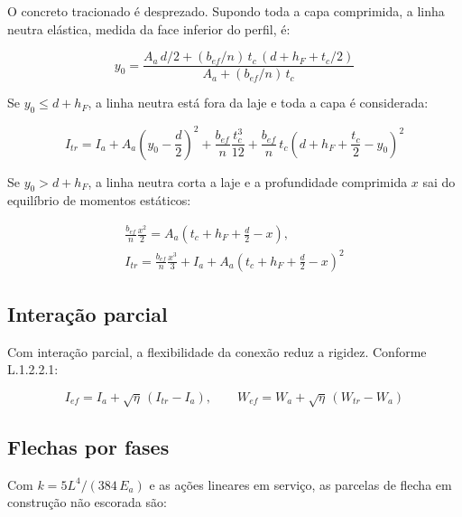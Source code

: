 O concreto tracionado é desprezado. Supondo toda a capa comprimida, a linha neutra elástica, medida da face inferior do perfil, é:

\[
  y_0 = \frac{A_a\,d/2 + (b_{ef}/n)\,t_c\,(d + h_F + t_c/2)}{A_a + (b_{ef}/n)\,t_c}
\]

Se $y_0 \le d + h_F$, a linha neutra está fora da laje e toda a capa é considerada:

\[
  I_{tr} = I_a + A_a\left(y_0 - \frac{d}{2}\right)^2 + \frac{b_{ef}}{n}\frac{t_c^3}{12} + \frac{b_{ef}}{n}\,t_c\left(d + h_F + \frac{t_c}{2} - y_0\right)^2
\]

Se $y_0 > d + h_F$, a linha neutra corta a laje e a profundidade comprimida $x$ sai do equilíbrio de momentos estáticos:

\begin{gather*}
  \frac{b_{ef}}{n}\frac{x^2}{2} = A_a\left(t_c + h_F + \frac{d}{2} - x\right), \\
  I_{tr} = \frac{b_{ef}}{n}\frac{x^3}{3} + I_a + A_a\left(t_c + h_F + \frac{d}{2} - x\right)^2
\end{gather*}

\subsection{Interação parcial}\label{sec:2.8.2}
Com interação parcial, a flexibilidade da conexão reduz a rigidez. Conforme L.1.2.2.1:

\[
  I_{ef} = I_a + \sqrt{\eta}\,(I_{tr} - I_a), \qquad W_{ef} = W_a + \sqrt{\eta}\,(W_{tr} - W_a)
\]

\subsection{Flechas por fases}\label{sec:2.8.3}
Com $k = 5L^4/(384\,E_a)$ e as ações lineares em serviço, as parcelas de flecha em construção não escorada são:

